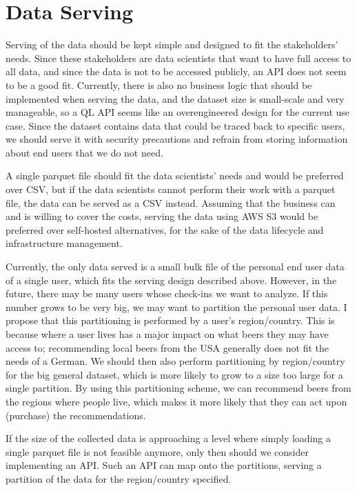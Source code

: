 \documentclass[sigconf]{acmart}
\begin{document}
\section{Data Serving}
Serving of the data should be kept simple and designed to fit the stakeholders' needs.
Since these stakeholders are data scientists that want to have full access to all data, and since the data is not to be accessed publicly, an API does not seem to be a good fit.
Currently, there is also no business logic that should be implemented when serving the data, and the dataset size is small-scale and very manageable, so a QL API seems like an overengineered design for the current use case.
Since the dataset contains data that could be traced back to specific users, we should serve it with security precautions and refrain from storing information about end users that we do not need.

A single parquet file should fit the data scientists' needs and would be preferred over CSV, but if the data scientists cannot perform their work with a parquet file, the data can be served as a CSV instead.
Assuming that the business can and is willing to cover the costs, serving the data using AWS S3 would be preferred over self-hosted alternatives, for the sake of the data lifecycle and infrastructure management.

Currently, the only data served is a small bulk file of the personal end user data of a single \citeauthor{untappd} user, which fits the serving design described above.
However, in the future, there may be many users whose check-ins we want to analyze.
If this number grows to be very big, we may want to partition the personal user data.
I propose that this partitioning is performed by a user's region/country.
This is because where a user lives has a major impact on what beers they may have access to; recommending local beers from the USA generally does not fit the needs of a German.
We should then also perform partitioning by region/country for the big general dataset, which is more likely to grow to a size too large for a single partition.
By using this partitioning scheme, we can recommend beers from the regions where people live, which makes it more likely that they can act upon (purchase) the recommendations.

If the size of the collected data is approaching a level where simply loading a single parquet file is not feasible anymore, only then should we consider implementing an API.
Such an API can map onto the partitions, serving a partition of the data for the region/country specified.
\end{document}

